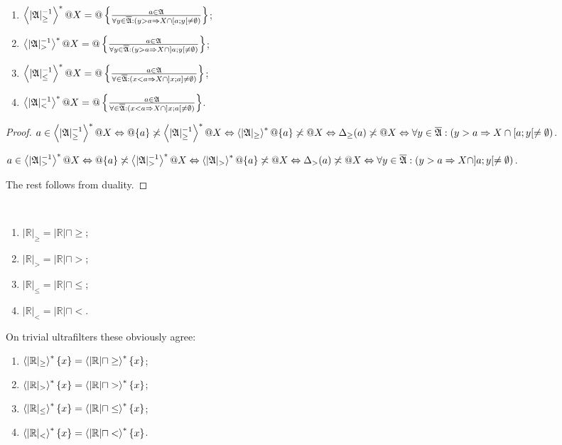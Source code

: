 \begin{prop}
~
\begin{enumerate}
\item $\left\langle |\mathfrak{A}|_{\geq}^{-1}\right\rangle ^{\ast}@X = @\left\{ \frac{a\in\mathfrak{A}}{\forall y\in\overline{\mathfrak{A}}:(y>a \Rightarrow X\cap[a;y[\ne\emptyset)}\right\}$;
\item $\left\langle |\mathfrak{A}|_{>}^{-1}\right\rangle ^{\ast}@X = @\left\{ \frac{a\in\mathfrak{A}}{\forall y\in\overline{\mathfrak{A}}:(y>a \Rightarrow X\cap]a;y[\ne\emptyset)}\right\}$;
\item $\left\langle |\mathfrak{A}|_{\leq}^{-1}\right\rangle ^{\ast}@X = @\left\{ \frac{a\in\mathfrak{A}}{\forall \in\overline{\mathfrak{A}}:(x<a \Rightarrow X\cap]x;a]\ne\emptyset)}\right\}$;
\item $\left\langle |\mathfrak{A}|_{<}^{-1}\right\rangle ^{\ast}@X = @\left\{ \frac{a\in\mathfrak{A}}{\forall \in\overline{\mathfrak{A}}:(x<a \Rightarrow X\cap]x;a[\ne\emptyset)}\right\}$.
\end{enumerate}
\end{prop}

\begin{proof}
$a\in\left\langle |\mathfrak{A}|_{\geq}^{-1}\right\rangle ^{\ast}@X \Leftrightarrow
@\{a\} \not\asymp \left\langle |\mathfrak{A}|_{\geq}^{-1}\right\rangle ^{\ast}@X \Leftrightarrow
\left\langle |\mathfrak{A}|_{\geq}\right\rangle ^{\ast}@\{a\} \not\asymp @X \Leftrightarrow
\Delta_{\geq}(a) \not\asymp @X \Leftrightarrow
\forall y\in\overline{\mathfrak{A}}:(y>a \Rightarrow X\cap[a;y[\ne\emptyset)$.

$a\in\left\langle |\mathfrak{A}|_{>}^{-1}\right\rangle ^{\ast}@X \Leftrightarrow
@\{a\} \not\asymp \left\langle |\mathfrak{A}|_{>}^{-1}\right\rangle ^{\ast}@X \Leftrightarrow
\left\langle |\mathfrak{A}|_{>}\right\rangle ^{\ast}@\{a\} \not\asymp @X \Leftrightarrow
\Delta_{>}(a) \not\asymp @X \Leftrightarrow
\forall y\in\overline{\mathfrak{A}}:(y>a \Rightarrow X\cap]a;y[\ne\emptyset)$.

The rest follows from duality.
\end{proof}

\begin{conjecture}
~
\begin{enumerate}
\item $|\mathbb{R}|_{\geq} = |\mathbb{R}| \sqcap \geq$;
\item $|\mathbb{R}|_{>} = |\mathbb{R}| \sqcap >$;
\item $|\mathbb{R}|_{\leq} = |\mathbb{R}| \sqcap \leq$;
\item $|\mathbb{R}|_{<} = |\mathbb{R}| \sqcap <$.
\end{enumerate}
\end{conjecture}

\begin{rem}
On trivial ultrafilters these obviously agree:
\begin{enumerate}
\item $\left\langle |\mathbb{R}|_{\geq}\right\rangle ^{\ast}\{x\} = \left\langle |\mathbb{R}| \sqcap \geq\right\rangle ^{\ast}\{x\}$;
\item $\left\langle |\mathbb{R}|_{>}\right\rangle ^{\ast}\{x\} = \left\langle |\mathbb{R}| \sqcap >\right\rangle ^{\ast}\{x\}$;
\item $\left\langle |\mathbb{R}|_{\leq}\right\rangle ^{\ast}\{x\} = \left\langle |\mathbb{R}| \sqcap \leq\right\rangle ^{\ast}\{x\}$;
\item $\left\langle |\mathbb{R}|_{<}\right\rangle ^{\ast}\{x\} = \left\langle |\mathbb{R}| \sqcap <\right\rangle ^{\ast}\{x\}$.
\end{enumerate}
\end{rem}

